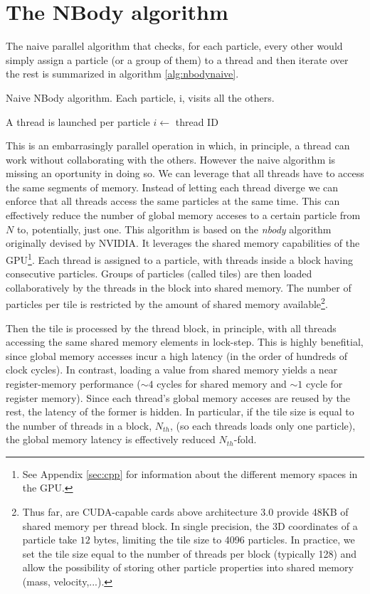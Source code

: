 \documentclass[ twoside,openright,titlepage,numbers=noenddot,%
headinclude,footinclude,cleardoublepage=empty,abstract=on,
BCOR=5mm,paper=a4,fontsize=11pt, dvipsnames
]{scrreprt}
\newcommand{\gpu}{\gls{GPU}\xspace}
\begin{document}
\section{The NBody algorithm}
The naive parallel algorithm that checks, for each particle, every other would simply assign a particle (or a group of them) to a thread and then iterate over the rest is summarized in algorithm \ref{alg:nbodynaive}.
\begin{algorithm}[H]
  \caption{Naive NBody algorithm. Each particle, i, visits all the others.}\label{alg:nbodynaive}
  \begin{algorithmic}[1]
    \Require A thread is launched per particle    
    \State $i \gets$ thread ID 
    \EndFor
  \end{algorithmic}
\end{algorithm}
This is an embarrasingly parallel operation in which, in principle, a thread can work without collaborating with the others. However the naive algorithm is missing an oportunity in doing so. We can leverage that all threads have to access the same segments of memory. Instead of letting each thread diverge we can enforce that all threads access the same particles at the same time. This can effectively reduce the number of global memory acceses to a certain particle from $N$ to, potentially, just one.
This algorithm is based on the \emph{nbody} algorithm originally devised by NVIDIA\cite{Nguyen2008,Wilt2013}. It leverages the shared memory capabilities of the \gpu\footnote{See Appendix \ref{sec:cpp} for information about the different memory spaces in the \gpu.}.
Each thread is assigned to a particle, with threads inside a block having consecutive particles.
Groups of particles (called tiles) are then loaded collaboratively by the threads in the block into shared memory.
The number of particles per tile is restricted by the amount of shared memory available\footnote{Thus far, are CUDA-capable cards above architecture 3.0 provide 48KB of shared memory per thread block. In single precision, the 3D coordinates of a particle take $12$ bytes, limiting the tile size to 4096 particles. In practice, we set the tile size equal to the number of threads per block (typically 128) and allow the possibility of storing other particle properties into shared memory (mass, velocity,...).}.

Then the tile is processed by the thread block, in principle, with all threads accessing the same shared memory elements in lock-step.
This is highly benefitial, since global memory accesses incur a high latency (in the order of hundreds of clock cycles). In contrast, loading a value from shared memory yields a near register-memory performance ($\sim 4$ cycles for shared memory and $\sim 1$ cycle for register memory). Since each thread's global memory acceses are reused by the rest, the latency of the former is hidden. In particular, if the tile size is equal to the number of threads in a block, $N_{th}$, (so each threads loads only one particle), the global memory latency is effectively reduced $N_{th}$-fold.
\end{document}
